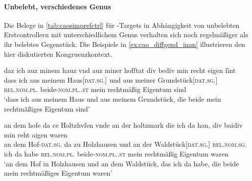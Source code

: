 %

\paragraph{Unbelebt, verschiedenes Genus}

Die Belege in \cref{tab:caosimprefctrl} für -Targets in
Abhängigkeit von unbelebten Erstcontrollern mit unterschiedlichem Genus
verhalten sich noch regelmäßiger als ihr belebtes Gegenstück. Die Beispiele in
\cref{ex:cao_diffgend_inan} illustrieren den hier diskutierten
Kongruenzkontext.

\begin{exe}
\ex \label{ex:cao_diffgend_inan}
	\begin{xlist}
	\ex \label{ex:cao_diffgend_inan_1}
		\gll daz ich auz minem hauz vnd auz miner hofſtat
			div bediv min recht eigen ſint \\
			dass ich aus meinem Haus[\textsc{dat.sg.\NeutI}] und aus meiner
			Grundstück[\textsc{dat.sg.\FemI}] \textsc{rel.nom.pl.\NeutI}
			beide-\textsc{nom.pl.\NeutI.st} mein rechtmäßig Eigentum sind \\
		\trans `dass ich aus meinem Haus und aus meinem Grundstück, die 
			beide mein rechtmäßiges Eigentum sind'
			\parencites(Nr.~1282, Regensburg, 1290)[526,37--38]{cao2}

	\ex \label{ex:cao_diffgend_inan_2}
		\gll an dem hofe da ce Holtzhvſen \textelp{} vnde an der
			holtzmark die ich da han, div baidiv min
			reht aigen waren \\
			an dem Hof-\textsc{dat.sg.\MascI} da zu Holzhausen {} und an der
			Waldstück[\textsc{dat.sg.\FemI}] \textsc{rel.nom.sg.\FemI} ich da habe
			\textsc{rel.nom.pl.\NeutI} beide-\textsc{nom.pl.\NeutI.st} mein
			rechtmäßig Eigentum waren \\
		\trans `an dem Hof in Holzhausen \textelp{} und an dem Waldstück,
			das ich da habe, die beide mein rechtmäßiges Eigentum waren'
			\parencites(Nr.~N~272, Augsburg, 1285)[215,30--31]{cao5}
	\end{xlist}
\end{exe}

